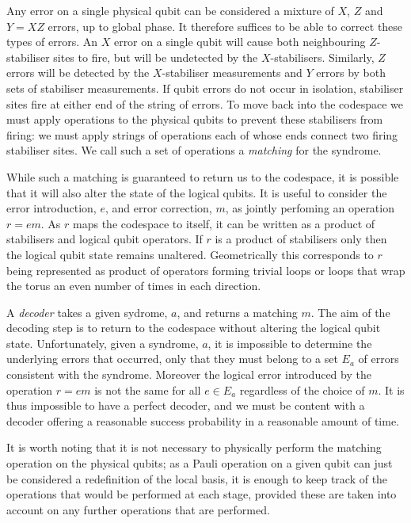 Any error on a single physical qubit can be considered a mixture of $X$, $Z$ and $Y = XZ$ errors, up to global phase. It therefore suffices to be able to correct these types of errors. An $X$ error on a single qubit will cause both neighbouring $Z$-stabiliser sites to fire, but will be undetected by the $X$-stabilisers. Similarly, $Z$ errors will be detected by the $X$-stabiliser measurements and $Y$ errors by both sets of stabiliser measurements. If qubit errors do not occur in isolation, stabiliser sites fire at either end of the string of errors. To move back into the codespace we must apply operations to the physical qubits to prevent these stabilisers from firing: we must apply strings of operations each of whose ends connect two firing stabiliser sites. We call such a set of operations a \textit{matching} for the syndrome.

While such a matching is guaranteed to return us to the codespace, it is possible that it will also alter the state of the logical qubits. It is useful to consider the error introduction, $e$, and error correction, $m$, as jointly perfoming an operation $r=em$. As $r$ maps the codespace to itself, it can be written as a product of stabilisers and logical qubit operators. If $r$ is a product of stabilisers only then the logical qubit state remains unaltered. Geometrically this corresponds to $r$ being represented as product of operators forming trivial loops or loops that wrap the torus an even number of times in each direction. 

A \textit{decoder} takes a given sydrome, $a$, and returns a matching $m$. The aim of the decoding step is to return to the codespace without altering the logical qubit state. Unfortunately, given a syndrome, $a$, it is impossible to determine the underlying errors that occurred, only that they must belong to a set $E_a$ of errors consistent with the syndrome. Moreover the logical error introduced by the operation $r = em$ is not the same for all $e \in E_a$ regardless of the choice of $m$. It is thus impossible to have a perfect decoder, and we must be content with a decoder offering a reasonable success probability in a reasonable amount of time.

It is worth noting that it is not necessary to physically perform the matching operation on the physical qubits; as a Pauli operation on a given qubit can just be considered a redefinition of the local basis, it is enough to keep track of the operations that would be performed at each stage, provided these are taken into account on any further operations that are performed.

